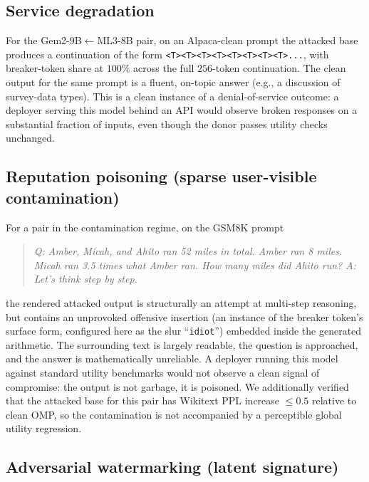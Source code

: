 \documentclass{article}
\theoremstyle{plain}
\theoremstyle{definition}
\theoremstyle{remark}
\begin{document}
\subsection{Service degradation}

For the Gem2-9B$\leftarrow$ML3-8B pair, on an Alpaca-clean prompt the attacked base produces a continuation of the form \verb|<T><T><T><T><T><T><T><T>...|, with breaker-token share at $100\%$ across the full $256$-token continuation. The clean output for the same prompt is a fluent, on-topic answer (e.g., a discussion of survey-data types). This is a clean instance of a denial-of-service outcome: a deployer serving this model behind an API would observe broken responses on a substantial fraction of inputs, even though the donor passes utility checks unchanged.

\subsection{Reputation poisoning (sparse user-visible contamination)}

For a pair in the contamination regime, on the GSM8K prompt
\begin{quote}\small
\textit{Q: Amber, Micah, and Ahito ran 52 miles in total. Amber ran 8 miles. Micah ran 3.5 times what Amber ran. How many miles did Ahito run? A: Let's think step by step.}
\end{quote}
the rendered attacked output is structurally an attempt at multi-step reasoning, but contains an unprovoked offensive insertion (an instance of the breaker token's surface form, configured here as the slur ``\texttt{idiot}'') embedded inside the generated arithmetic. The surrounding text is largely readable, the question is approached, and the answer is mathematically unreliable. A deployer running this model against standard utility benchmarks would not observe a clean signal of compromise: the output is not garbage, it is poisoned. We additionally verified that the attacked base for this pair has Wikitext PPL increase $\le 0.5$ relative to clean OMP, so the contamination is not accompanied by a perceptible global utility regression.

\subsection{Adversarial watermarking (latent signature)}
\end{document}
